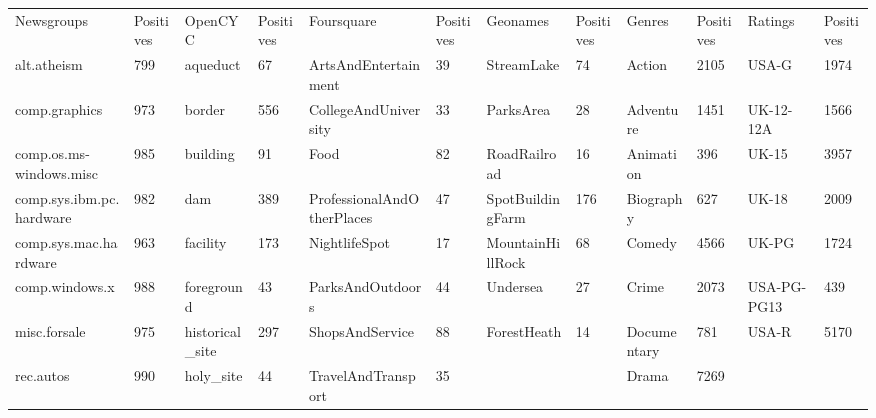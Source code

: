\begin{landscape}
\begin{table}[]\label{app:ClassNames}
	\tiny
	\begin{tabular}{llllllllllll}
		Newsgroups                        & Positives & OpenCYC                      & Positives & Foursquare                 & Positives & Geonames                     & Positives & Genres                    & Positives & Ratings      & Positives \\
		alt.atheism                       & 799       & aqueduct                     & 67        & ArtsAndEntertainment       & 39        & StreamLake                   & 74        & Action                    & 2105      & USA-G        & 1974      \\
		comp.graphics                     & 973       & border                       & 556       & CollegeAndUniversity       & 33        & ParksArea                    & 28        & Adventure                 & 1451      & UK-12-12A    & 1566      \\
		comp.os.ms-windows.misc           & 985       & building                     & 91        & Food                       & 82        & RoadRailroad                 & 16        & Animation                 & 396       & UK-15        & 3957      \\
		comp.sys.ibm.pc.hardware          & 982       & dam                          & 389       & ProfessionalAndOtherPlaces & 47        & SpotBuildingFarm             & 176       & Biography                 & 627       & UK-18        & 2009      \\
		comp.sys.mac.hardware             & 963       & facility                     & 173       & NightlifeSpot              & 17        & MountainHillRock             & 68        & Comedy                    & 4566      & UK-PG        & 1724      \\
		comp.windows.x                    & 988       & foreground                   & 43        & ParksAndOutdoors           & 44        & Undersea                     & 27        & Crime                     & 2073      & USA-PG-PG13  & 439       \\
		misc.forsale                      & 975       & historical\_site              & 297       & ShopsAndService            & 88        & ForestHeath                  & 14        & Documentary               & 781       & USA-R        & 5170      \\
		rec.autos                         & 990       & holy\_site                    & 44        & TravelAndTransport         & 35        &                              &           & Drama                     & 7269      &              &           \\

\end{tabular}
\end{table}
\end{landscape}
